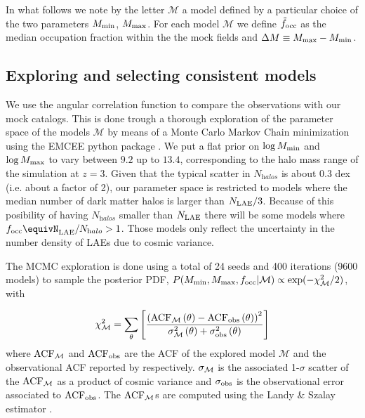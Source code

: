 \documentclass{emulateapj}
\newcommand{\mmin}{{\ifmmode{{M_{\rm min}}}\else{${M_{\rm min}}$}\fi}}
\newcommand{\mmax}{{\ifmmode{{M_{\rm max}}}\else{${M_{\rm max}}$}\fi}}
\newcommand{\focc}{{\ifmmode{{f_{\rm occ}}}\else{${f_{\rm occ}}$}\fi}}
\begin{document}
In what follows we note by the letter ${\mathcal M}$ a model
defined by a particular choice of the two parameters $M_{\rm min}$, 
$M_{\rm  max}$. For each model  ${\mathcal M}$ we define $\tilde{f}_{\rm occ}$ as the median occupation fraction within the the mock fields and  $\Delta M \equiv \mmax-\mmin$.

\subsection{Exploring and selecting consistent models}
\label{subsec:explore}
We use the angular correlation function to compare the observations with our mock catalogs. 
This is done trough a thorough exploration of the parameter space of the models ${\mathcal M}$ by  means of a Monte Carlo Markov Chain minimization using  the EMCEE python package \citep{emcee2013}.
We put a flat prior on $\log M_{\rm min}$ and $\log \mmax$ to vary between $9.2$ up to $13.4$, corresponding to the halo mass range of the simulation at $z=3$. 
Given that the typical scatter  in $N_{\mathrm halos}$ is about 0.3 dex (i.e. about  a factor of 2), our parameter space is restricted to models where the median number of dark matter halos is larger than  $N_{\rm LAE}/3$. Because of this posibility of having $N_{\mathrm halos}$  smaller than $N_{\rm LAE}$ there will be some models where    $\focc\equivN_{\rm LAE}/N_{\mathrm halo}>1$. Those models only reflect the uncertainty in the number density of LAEs due to cosmic variance.


The MCMC exploration is done using a total of 24 seeds and 400
iterations (9600 models) to sample the posterior PDF,  $P(\mmin,
\mmax, f_{\rm occ}| \mathcal{M}) \propto \exp(-\chi_{\mathcal
  M}^2/2)$, with 

\begin{equation}
\chi_{\mathcal M}^2=\sum_{\theta}\left[\frac{\left( \rm{ACF}_{\mathcal M}\left(\theta\right) - \rm{ACF}_{\rm obs}\left(\theta\right)\right)^2}{ \sigma_{\rm \mathcal M}^{2}\left(\theta\right) + \sigma_{\rm obs}^{2}\left(\theta\right)}\right]
\end{equation}
%
where  $\rm{ACF}_{\mathcal M}$ and  $\rm{ACF}_{\rm obs}$ are the ACF
of the explored model ${\mathcal M}$ and the observational ACF
reported by \citet{Bielby16} respectively. $\sigma_{\rm \mathcal M}$
is the associated 1-$\sigma$ scatter  of the $\rm{ACF}_{\mathcal M}$
as a product of cosmic variance and  $\sigma_{\rm obs}$ is the
observational error associated to $\rm{ACF}_{\rm obs}$.  The
$\rm{ACF}_{\mathcal M}$s are computed using the Landy \&  Szalay
estimator  \citep{Landy1993}.  
\end{document}
